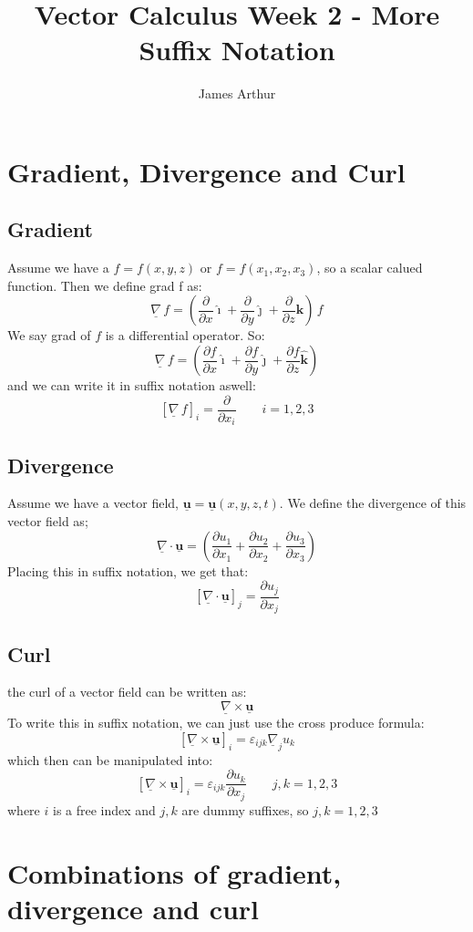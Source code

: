 \documentclass{article}
\title{Vector Calculus Week 2 - More Suffix Notation}
\author{James Arthur}
\renewcommand{\vec}[1]{\underline{\textbf{#1}}}
\newcommand{\veci}{\bm{\hat{\imath}}}
\newcommand{\vecj}{\bm{\hat{\jmath}}}
\newcommand{\veck}{\bm{\hat{k}}}
\newcommand{\e}{\varepsilon}
\newcommand{\nab}{\underline{\nabla}}
\newcommand{\grad}{{\nab}\, f}
\newcommand{\pd}[2]{\frac{\partial #1}{\partial #2}}
\renewcommand{\div}{\nab \cdot}
\newcommand{\curl}{\nab \times}
\begin{document}
\maketitle
\tableofcontents\newpage



\section{Gradient, Divergence and Curl}
\subsection{Gradient}

Assume we have a $f = f(x, y, z)$ or $f = f(x_1,x_2,x_3)$, so a scalar calued function. Then we define grad f as:
$$ \grad = \left(\pd{}{x}\veci + \pd{}{y}\vecj + \pd{}{z}\veck \right)\, f$$
We say grad of $f$ is a differential operator. So:
$$ \grad = \left(\pd{f}{x}\veci + \pd{f}{y}\vecj + \pd{f}{z}\veck \right) $$
and we can write it in suffix notation aswell:
$$ \left[ \grad \right]_i = \pd{}{x_i} \qquad i = 1, 2, 3$$

\subsection{Divergence}

Assume we have a vector field, $\vec{u} = \vec{u} (x, y, z, t)$. We define the divergence of this vector field as;
$$ \nab \cdot \vec{u} = \left(\pd{u_1}{x_1} + \pd{u_2}{x_2} + \pd{u_3}{x_3}\right)$$
Placing this in suffix notation, we get that:
$$ [\nab \cdot \vec{u}]_j = \pd{u_j}{x_j} $$

\subsection{Curl}

the curl of a vector field can be written as:
$$ \nab \times \vec{u} $$
To write this in suffix notation, we can just use the cross produce formula:
$$ [\nab \times \vec{u}]_i = \e_{ijk} \nab_j u_k $$
which then can be manipulated into:
$$ [\nab \times \vec{u}]_i = \e_{ijk} \pd{u_k}{x_j} \qquad j,k = 1, 2, 3 $$
where $i$ is a free index and $j, k$ are dummy suffixes, so $j, k = 1, 2, 3$

\section{Combinations of gradient, divergence and curl}%
\end{document}
